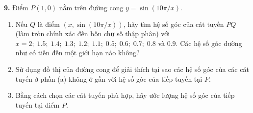 \begin{minipage}[t]{0.485\textwidth}
\vspace{5pt}
\textbf{9.} Điểm $P(1, 0)$ nằm trên đường cong $y = \sin(10\pi/x)$.
\begin{enumerate}[label=\textbf{(\alph*)}, leftmargin=*]
    \item Nếu $Q$ là điểm $(x, \sin(10\pi/x))$, hãy tìm hệ số góc của cát tuyến $PQ$ (làm tròn chính xác đến bốn chữ số thập phân) với $x = 2;\; 1.5;\; 1.4;\; 1.3;\; 1.2;\; 1.1;\; 0.5;\; 0.6;\; 0.7;\; 0.8$ và $0.9$. Các hệ số góc dường như có tiến đến một giới hạn nào không?
    \item Sử dụng đồ thị của đường cong để giải thích tại sao các hệ số góc của các cát tuyến ở phần (a) không ở gần với hệ số góc của tiếp tuyến tại $P$.
    \item Bằng cách chọn các cát tuyến phù hợp, hãy ước lượng hệ số góc của tiếp tuyến tại điểm $P$.
\end{enumerate}

\end{minipage}
